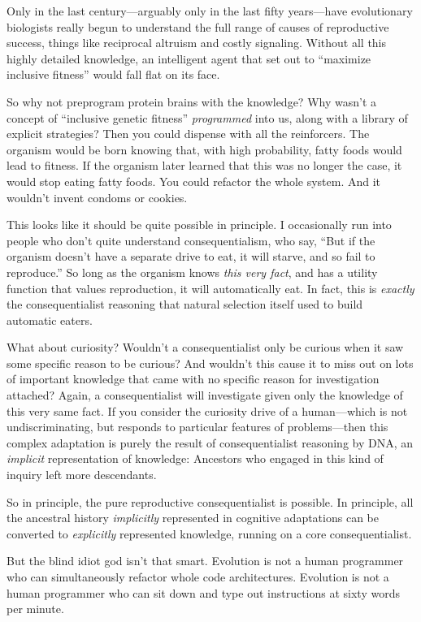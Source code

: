 {
 Only in the last century---arguably only in the last fifty
years---have evolutionary biologists really begun to understand the
full range of causes of reproductive success, things like reciprocal
altruism and costly signaling. Without all this highly detailed
knowledge, an intelligent agent that set out to
``maximize inclusive fitness'' would
fall flat on its face.}

{
 So why not preprogram protein brains with the knowledge? Why
wasn't a concept of ``inclusive
genetic fitness'' \textit{programmed} into us, along
with a library of explicit strategies? Then you could dispense with all
the reinforcers. The organism would be born knowing that, with high
probability, fatty foods would lead to fitness. If the organism later
learned that this was no longer the case, it would stop eating fatty
foods. You could refactor the whole system. And it
wouldn't invent condoms or cookies.}

{
 This looks like it should be quite possible in principle. I
occasionally run into people who don't quite understand
consequentialism, who say, ``But if the organism
doesn't have a separate drive to eat, it will starve,
and so fail to reproduce.'' So long as the organism
knows \textit{this very fact}, and has a utility function that values
reproduction, it will automatically eat. In fact, this is
\textit{exactly} the consequentialist reasoning that natural selection
itself used to build automatic eaters.}

{
 What about curiosity? Wouldn't a consequentialist
only be curious when it saw some specific reason to be curious? And
wouldn't this cause it to miss out on lots of important
knowledge that came with no specific reason for investigation attached?
Again, a consequentialist will investigate given only the knowledge of
this very same fact. If you consider the curiosity drive of a
human---which is not undiscriminating, but responds to particular
features of problems---then this complex adaptation is purely the
result of consequentialist reasoning by DNA, an \textit{implicit}
representation of knowledge: Ancestors who engaged in this kind of
inquiry left more descendants.}

{
 So in principle, the pure reproductive consequentialist is
possible. In principle, all the ancestral history \textit{implicitly}
represented in cognitive adaptations can be converted to
\textit{explicitly} represented knowledge, running on a core
consequentialist.}

{
 But the blind idiot god isn't that smart.
Evolution is not a human programmer who can simultaneously refactor
whole code architectures. Evolution is not a human programmer who can
sit down and type out instructions at sixty words per minute.}

